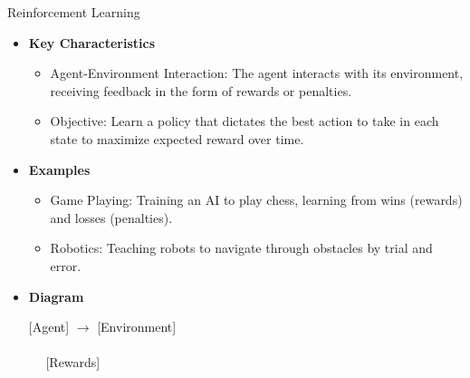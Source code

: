 \documentclass[aspectratio=169]{beamer}
\begin{document}
\begin{frame}[fragile]
\begin{block}{Reinforcement Learning}
\begin{itemize}
            \item \textbf{Key Characteristics}
                \begin{itemize}
                    \item Agent-Environment Interaction: The agent interacts with its environment, receiving feedback in the form of rewards or penalties.
                    \item Objective: Learn a policy that dictates the best action to take in each state to maximize expected reward over time.
                \end{itemize}

            \item \textbf{Examples}
                \begin{itemize}
                    \item Game Playing: Training an AI to play chess, learning from wins (rewards) and losses (penalties).
                    \item Robotics: Teaching robots to navigate through obstacles by trial and error.
                \end{itemize}
    
            \item \textbf{Diagram}
                \begin{center}
                    [Agent] $\rightarrow$ [Environment] \\
                    \quad \quad \quad \quad \quad \quad \quad \quad \\
                    [Actions] $\quad$ [Rewards]
                \end{center}
        \end{itemize}
    \end{block}
\end{frame}
\end{document}
